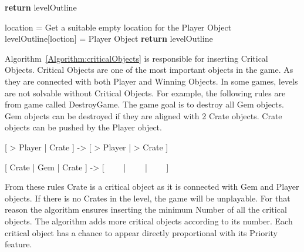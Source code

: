 \documentclass[letterpaper]{article}
\newcommand{\algref}[1]{Algorithm~\ref{Algorithm:#1}}
\begin{document}
\begin{algorithm}[ht]
	\BlankLine
	\BlankLine
	\BlankLine
	\textbf{return} levelOutline\;
	\caption{Winning Objects Insertion Algorithm}
	\label{Algorithm:winningObjects}
\end{algorithm}

\begin{algorithm}[ht]
	\BlankLine
	location = Get a suitable empty location for the Player Object\;
	levelOutline[loction] = Player Object\;
	\BlankLine
	\textbf{return} levelOutline\;
	\caption{Player Object Insertion Algorithm}
	\label{Algorithm:playerObject}
\end{algorithm}

\algref{criticalObjects} is responsible for inserting Critical Objects. Critical Objects are one of the most important objects in the game. As they are connected with both Player and Winning Objects. In some games, levels are not solvable without Critical Objects. For example, the following rules are from game called DestroyGame. The game goal is to destroy all Gem objects. Gem objects can be destroyed if they are aligned with 2 Crate objects. Crate objects can be pushed by the Player object.
\begin{center} [ > Player | Crate ] -> [ > Player | > Crate ]\end{center}
\begin{center} [ Crate | Gem | Crate ] -> [ \ \ \ \ | \ \ \ \ | \ \ \ \ ]\end{center}
From these rules Crate is a critical object as it is connected with Gem and Player objects. If there is no Crates in the level, the game will be unplayable. For that reason the algorithm ensures inserting the minimum Number of all the critical objects. The algorithm adds more critical objects according to its number. Each critical object has a chance to appear directly proportional with its Priority feature.\\
\end{document}
